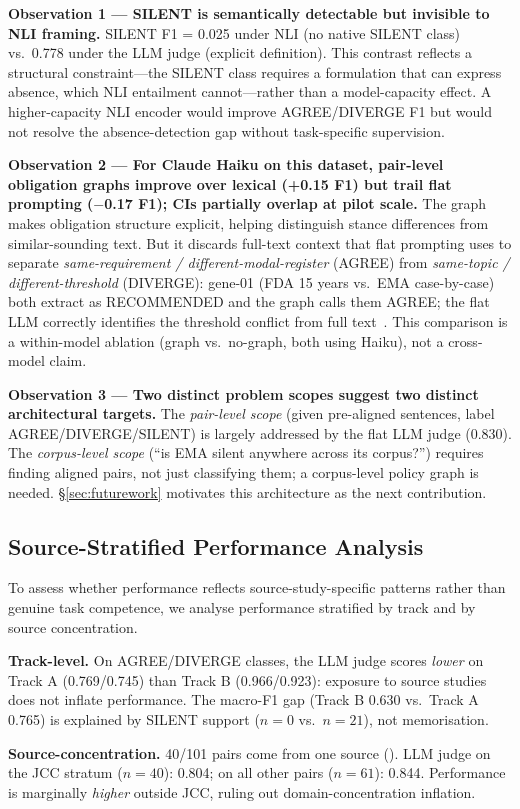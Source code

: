 \documentclass[manuscript]{acmart}
\begin{document}
\textbf{Observation 1 --- SILENT is semantically detectable but invisible to
NLI framing.} SILENT F1 = 0.025 under NLI (no native SILENT class) vs.\ 0.778
under the LLM judge (explicit definition). This contrast reflects a structural
constraint---the SILENT class requires a formulation that can express absence,
which NLI entailment cannot---rather than a model-capacity effect. A
higher-capacity NLI encoder would improve AGREE/DIVERGE F1 but would not
resolve the absence-detection gap without task-specific supervision.

\textbf{Observation 2 --- For Claude Haiku on this dataset, pair-level
obligation graphs improve over lexical (+0.15 F1) but trail flat prompting
($-$0.17 F1); CIs partially overlap at pilot scale.} The graph makes
obligation structure explicit, helping distinguish stance differences from
similar-sounding text. But it discards full-text context that flat prompting
uses to separate \textit{same-requirement / different-modal-register} (AGREE)
from \textit{same-topic / different-threshold} (DIVERGE): gene-01 (FDA
15 years vs.\ EMA case-by-case) both extract as RECOMMENDED and the graph
calls them AGREE; the flat LLM correctly identifies the threshold conflict from
full text~\citep{qian2026evidenceforce}. This comparison is a within-model
ablation (graph vs.\ no-graph, both using Haiku), not a cross-model claim.

\textbf{Observation 3 --- Two distinct problem scopes suggest two distinct
architectural targets.} The \textit{pair-level scope} (given pre-aligned
sentences, label AGREE/DIVERGE/SILENT) is largely addressed by the flat LLM
judge (0.830). The \textit{corpus-level scope} (``is EMA silent anywhere
across its corpus?'') requires finding aligned pairs, not just classifying
them; a corpus-level policy graph is needed. \S\ref{sec:futurework} motivates
this architecture as the next contribution.

\subsection{Source-Stratified Performance Analysis}
\label{sec:source_stratified}

\begin{revblock}
To assess whether performance reflects source-study-specific patterns rather
than genuine task competence, we analyse performance stratified by track and
by source concentration.

\textbf{Track-level.} On AGREE/DIVERGE classes, the LLM judge scores
\textit{lower} on Track A (0.769/0.745) than Track B (0.966/0.923): exposure
to source studies does not inflate performance. The macro-F1 gap (Track B 0.630
vs.\ Track A 0.765) is explained by SILENT support ($n = 0$ vs.\ $n = 21$),
not memorisation.

\textbf{Source-concentration.} 40/101 pairs come from one source
(\citeauthor{uc2025jcc}). LLM judge on the JCC stratum ($n = 40$): 0.804;
on all other pairs ($n = 61$): 0.844. Performance is marginally
\textit{higher} outside JCC, ruling out domain-concentration inflation.
\end{revblock}
\end{document}
